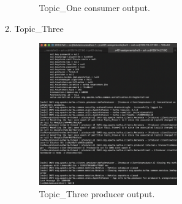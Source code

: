 \documentclass{article}
\begin{document}
\begin{enumerate}
\begin{enumerate}
\begin{figure}[H]
\begin{minipage}{0.45\textwidth}
        \caption{Topic\_One consumer output.}
      \end{minipage}
    \end{figure}
    \item Topic\_Three
    \begin{figure}[H]
      \centering
      \includegraphics[width=0.6\textwidth]{image13.png}
      \caption{Topic\_Three producer output.}
    \end{figure}


\end{enumerate}
\end{enumerate}
\end{document}
